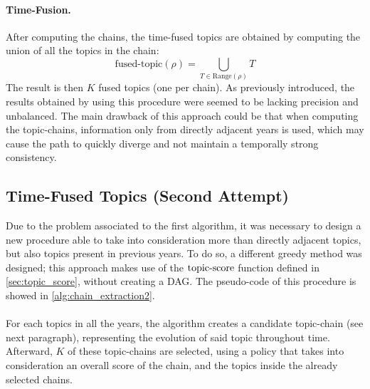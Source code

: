 \paragraph{\textbf{Time-Fusion.}} After computing the chains, the time-fused topics are obtained by computing the union of all the topics in the chain:
$$
\mathrm{fused\text{-}topic}(\rho) = \bigcup_{T\in\mathrm{Range}(\rho)} T
$$
The result is then $K$ fused topics (one per chain). As previously introduced, the results obtained by using this procedure were seemed to be lacking precision and unbalanced.
The main drawback of this approach could be that when computing the topic-chains, information only from directly adjacent years is used, which may cause the path to quickly diverge and not maintain a temporally strong consistency.

\subsection{Time-Fused Topics (Second Attempt)}
Due to the problem associated to the first algorithm, it was necessary to design a new procedure able to take into consideration more than directly adjacent topics, but also topics present in previous years. To do so, a different greedy method was designed; this approach makes use of the $\mathop{\mathrm{topic\text{-}score}}$ function defined in \cref{sec:topic_score}, without creating a DAG. The pseudo-code of this procedure is showed in \cref{alg:chain_extraction2}.

\paragraph{} For each topics in all the years, the algorithm creates a candidate topic-chain (see next paragraph), representing the evolution of said topic throughout time.
Afterward, $K$ of these topic-chains are selected, using a policy that takes into consideration an overall score of the chain, and the topics inside the already selected chains.



